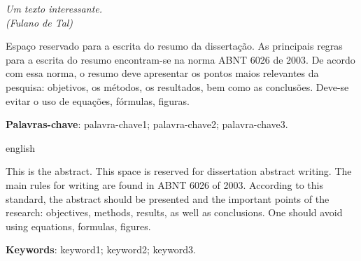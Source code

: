 \begin{epigrafe}
    \vspace*{\fill}
	\begin{flushright}
		\textit{
            Um texto interessante.\\
		      (Fulano de Tal)
        }
	\end{flushright}
\end{epigrafe}


\begin{resumo}
\SingleSpacing

    \noindent Espaço reservado para a escrita do resumo da dissertação. As principais regras para a escrita do resumo encontram-se na norma ABNT 6026 de 2003. De acordo com essa norma, o resumo deve apresentar os pontos maios relevantes da pesquisa: objetivos, os métodos, os resultados, bem como as conclusões. Deve-se evitar o uso de equações, fórmulas, figuras.
    
    \vspace{\onelineskip}
    
    \noindent
    \textbf{Palavras-chave}: palavra-chave1; palavra-chave2; palavra-chave3.
    
\end{resumo}

\begin{resumo}
\SingleSpacing
    \begin{otherlanguage*}{english}
    
        \noindent This is the abstract. This space is reserved for dissertation abstract writing. The main rules for writing are found in ABNT 6026 of 2003. According to this standard, the abstract should be presented and the important points of the research: objectives, methods, results, as well as conclusions. One should avoid using equations, formulas, figures.
        
        \vspace{\onelineskip}
        
        \noindent 
        \textbf{Keywords}: keyword1; keyword2; keyword3.
        
    \end{otherlanguage*}
\end{resumo}


\listoffigures*
\vspace{-1.35cm}
\listofquadros*
\cleardoublepage


